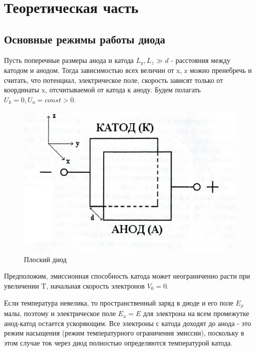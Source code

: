 



\def\labauthors{Карусевич А.А., Разова А.А.}
\def\labgroup{440}
\def\labnumber{1}
\def\labtheme{Исследование влияния пространственного заряда на прохождение тока в диоде}
\renewcommand{\vec}{\mathbf}
\renewcommand{\phi}{\varphi}
\renewcommand{\hat}{\widehat}



\section{Теоретическая часть}
\subsection{Основные режимы работы диода}
Пусть поперечные размеры анода и катода $L_y,L_z \gg d$ - расстояния между катодом и анодом. Тогда зависимостью всех величин от x, z можно пренебречь и считать, что потенциал, электрическое поле, скорость зависят только от координаты x, отсчитываемой от катода к аноду. Будем полагать $U_k=0, U_a=const > 0$.

\begin{figure}[h!]
	\centering
	\includegraphics[width=0.35\linewidth]{fig/img8062.jpg}
	\caption{Плоский диод}
	\label{fig:1}
\end{figure}

Предположим, эмиссионная способность катода может неограниченно расти при увеличении T, начальная скорость электронов $V_0=0$.

Если температура невелика, то пространственный заряд в диоде и его поле $E_{\rho}$ малы, поэтому и электрическое поле $E_x=E$ для электрона на всем промежутке анод-катод остается ускоряющим. Все электроны с катода доходят до анода - это режим насыщения (режим температурного ограничения эмиссии), поскольку в этом случае ток через диод полностью определяются температурой катода.


